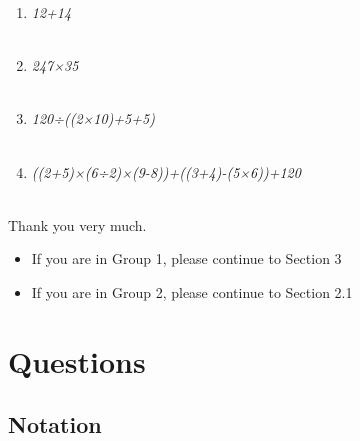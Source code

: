 \documentclass[14pt]{article}
\begin{document}
\begin{enumerate}
\item \emph{12+14}\\

\fbox{
\begin{minipage}{16cm}
\hfill\vspace{3cm}
\end{minipage}
}\\

\item \emph{247×35}\\

\fbox{
\begin{minipage}{16cm}
\hfill\vspace{3cm}
\end{minipage}
}\\

\item \emph{120÷((2×10)+5+5)}\\

\fbox{
\begin{minipage}{16cm}
\hfill\vspace{3cm}
\end{minipage}
}\\

\pagebreak

\item \emph{((2+5)×(6÷2)×(9-8))+((3+4)-(5×6))+120}\\

\fbox{
\begin{minipage}{16cm}
\hfill\vspace{3cm}
\end{minipage}
}\\

\end{enumerate}

Thank you very much.

\begin{itemize}
\item If you are in Group 1, please continue to Section 3
\item If you are in Group 2, please continue to Section 2.1
\end{itemize}

\pagebreak

\section{Questions}

\subsection{Notation}
\end{document}
